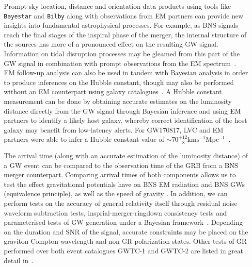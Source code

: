 Prompt sky location, distance and orientation data products 
using tools like \texttt{Bayestar} and 
\texttt{Bilby} along with observations from \ac{EM} 
partners can provide new insights into 
fundamental astrophysical processes. For example, as \ac{BNS} signals 
reach the final stages of the inspiral phase of the merger, the internal 
structure of the sources has more of a pronounced effect on the 
resulting \ac{GW} signal. Information on tidal disruption processes 
may be gleamed from this part of the 
\ac{GW} signal in combination with prompt observations from the 
\ac{EM} spectrum~\cite{1989thyg.book.....H}.
\ac{EM} follow-up analysis can also be used in tandem with 
Bayesian analysis in order to produce inferences on the 
Hubble constant, though may also be performed without an \ac{EM} 
counterpart using galaxy catalogues~\cite{2020PhRvD.101l2001G}. A 
Hubble constant measurement can 
be done by obtaining accurate estimates on the luminosity distance directly 
from the \ac{GW} signal through Bayesian inference and using 
\ac{EM} partners to 
identify a likely host galaxy, whereby correct 
identification of the host galaxy may benefit 
from low-latency alerts. For GW170817, \ac{LVC} and \ac{EM} partners were 
able to infer a Hubble constant value of $\sim 70^{+12}_{-8} 
\mathrm{km s^{-1} Mpc^{-1}}$~\cite{Abbott2017,PhysRevLett.119.161101}. 
 
%
%
The arrival time (along with an accurate estimation of the luminosity distance) of a \ac{GW} event can be compared to the observation time of the \ac{GRB} from a \ac{BNS} merger counterpart. Comparing arrival 
times of both components allows us to test the effect gravitational potentials have on 
\ac{BNS} \ac{EM} radiation and \ac{BNS} \ac{GW}s (equivalence principle), as well as the speed of gravity \cite{2017arXiv171005834L}. In addition, 
we can perform tests on the accuracy of general relativity itself through residual noise waveform subtraction tests, insprial-merger-ringdown consistency tests and parameterised tests of 
\ac{GW} generation under a Bayesian framework~\cite{2019PhRvD.100j4036A}. Depending on the duration and \ac{SNR} of the signal, accurate constraints may be placed on the graviton Compton wavelength and non-\ac{GR} polarization states. Other tests of \ac{GR}
performed over both event catalogues GWTC-1 and GWTC-2 are listed in great detail in~\cite{PhysRevLett.116.221101,2019PhRvD.100j4036A,PhysRevD.103.122002}.


%
%

